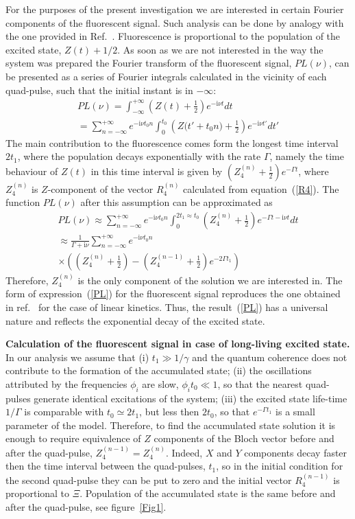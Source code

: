 \documentclass[prb,twocolumn,showpacs,epsfig,epsf]{revtex4}
\renewcommand{\i}{\mathrm{i}}
\newcommand{\1}{\mathds{1}}
\begin{document}
For the purposes of the present investigation we are interested in certain Fourier components of the fluorescent signal. Such analysis can be done by analogy with the one provided in Ref.~\cite{our}. Fluorescence is proportional to the population of the excited state, $Z(t)+1/2$. As soon as we are not interested in the way the system was prepared the Fourier transform of the fluorescent signal, $PL(\nu)$, can be presented as a series of Fourier integrals calculated in the vicinity of each quad-pulse, such that the initial instant is in $-\infty$:
\begin{multline}\label{PL0}
PL(\nu)=\int_{-\infty}^{+\infty}\left(Z(t)+\frac{1}{2}\right)e^{-\i\nu t}dt\\
=\sum_{n=-\infty}^{+\infty} e^{-\i\nu t_0 n} \int_0^{t_0}\left(Z\big(t'+t_0 n\big)+\frac{1}{2}\right)e^{-\i\nu t'}dt'
\end{multline}
The main contribution to the fluorescence comes form the longest time interval $2t_1$, where the population decays exponentially with the rate $\Gamma$, namely the time behaviour of $Z(t)$ in this time interval is given by $\left(Z_4^{(n)}+\frac{1}{2}\right)e^{-\Gamma t}$, where $Z_4^{(n)}$ is $Z$-component of the vector $R_4^{(n)}$ calculated from equation~(\ref{R4}). The function  $PL(\nu)$ after this assumption can be approximated as 
\begin{multline}\label{PL}
PL(\nu)\approx\sum_{n=-\infty}^{+\infty} e^{-\i\nu t_0 n}\int_0^{2t_1\approx t_0}\left(Z_4^{(n)}+\frac{1}{2}\right)e^{-\Gamma t-\i\nu t}dt\\
\approx\frac{1}{\Gamma+\i\nu}\sum_{n=-\infty}^{+\infty} e^{-\i\nu t_0 n} \\\times \left(\left(Z_4^{(n)}+\frac{1}{2}\right) -\left(Z_4^{(n-1)}+\frac{1}{2}\right) e^{-2\Gamma t_1}\right)
\end{multline}
Therefore, $Z^{(n)}_4$ is the only component of the solution we are interested in. The form of expression~(\ref{PL}) for the fluorescent signal reproduces the one obtained in ref.~\cite{our} for the case of linear kinetics. Thus, the result~(\ref{PL}) has a universal nature and reflects the exponential decay of the excited state. 

{\bf Calculation of the fluorescent signal in case of long-living excited state.} 
In our analysis we assume that (i) $t_1\gg 1/\gamma$ and the quantum coherence does not contribute to the formation of the accumulated state; (ii) the oscillations attributed by the frequencies $\phi_i$ are slow, $\phi_i t_0\ll 1$, so that the nearest quad-pulses generate identical excitations of the system; (iii) the excited state life-time $1/\Gamma$ is comparable with $t_0\simeq 2t_1$, but less then $2t_0$, so that $e^{-\Gamma t_1}$ is a small parameter of the model. Therefore, to find the accumulated state solution it is enough to require equivalence of $Z$ components of the Bloch vector before and after the quad-pulse, $Z_4^{(n-1)}=Z_4^{(n)}$. Indeed, $X$ and $Y$ components decay faster then the time interval between the quad-pulses, $t_1$, so in the initial condition for the second quad-pulse they can be put to zero and the initial vector $R_4^{(n-1)}$ is proportional to $\Xi$. Population of the accumulated state is the same before and after the quad-pulse, see figure~\ref{Fig1}. 
\end{document}
